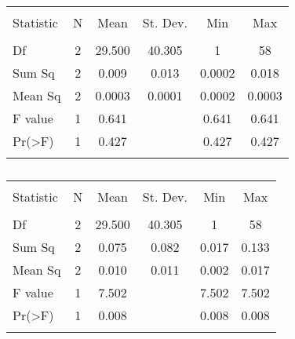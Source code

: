 \begin{table}[!htbp] \centering 
  \caption{} 
  \label{} 
\begin{tabular}{@{\extracolsep{5pt}}lccccc} 
\\[-1.8ex]\hline 
\hline \\[-1.8ex] 
Statistic & \multicolumn{1}{c}{N} & \multicolumn{1}{c}{Mean} & \multicolumn{1}{c}{St. Dev.} & \multicolumn{1}{c}{Min} & \multicolumn{1}{c}{Max} \\ 
\hline \\[-1.8ex] 
Df & 2 & 29.500 & 40.305 & 1 & 58 \\ 
Sum Sq & 2 & 0.009 & 0.013 & 0.0002 & 0.018 \\ 
Mean Sq & 2 & 0.0003 & 0.0001 & 0.0002 & 0.0003 \\ 
F value & 1 & 0.641 &  & 0.641 & 0.641 \\ 
Pr(\textgreater F) & 1 & 0.427 &  & 0.427 & 0.427 \\ 
\hline \\[-1.8ex] 
\end{tabular} 
\end{table} 

\begin{table}[!htbp] \centering 
  \caption{} 
  \label{} 
\begin{tabular}{@{\extracolsep{5pt}}lccccc} 
\\[-1.8ex]\hline 
\hline \\[-1.8ex] 
Statistic & \multicolumn{1}{c}{N} & \multicolumn{1}{c}{Mean} & \multicolumn{1}{c}{St. Dev.} & \multicolumn{1}{c}{Min} & \multicolumn{1}{c}{Max} \\ 
\hline \\[-1.8ex] 
Df & 2 & 29.500 & 40.305 & 1 & 58 \\ 
Sum Sq & 2 & 0.075 & 0.082 & 0.017 & 0.133 \\ 
Mean Sq & 2 & 0.010 & 0.011 & 0.002 & 0.017 \\ 
F value & 1 & 7.502 &  & 7.502 & 7.502 \\ 
Pr(\textgreater F) & 1 & 0.008 &  & 0.008 & 0.008 \\ 
\hline \\[-1.8ex] 
\end{tabular} 
\end{table} 

